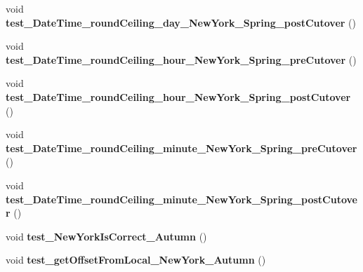 \begin{DoxyCompactItemize}
\item 
\hypertarget{classorg_1_1joda_1_1time_1_1_test_date_time_zone_cutover_a96cc00d2dcfd3eb93d263fc3bb6e4cfe}{void {\bfseries test\-\_\-\-Date\-Time\-\_\-round\-Ceiling\-\_\-day\-\_\-\-New\-York\-\_\-\-Spring\-\_\-post\-Cutover} ()}\label{classorg_1_1joda_1_1time_1_1_test_date_time_zone_cutover_a96cc00d2dcfd3eb93d263fc3bb6e4cfe}

\item 
\hypertarget{classorg_1_1joda_1_1time_1_1_test_date_time_zone_cutover_a1a1c0bdd0bbf9d72fb134674c1a861fa}{void {\bfseries test\-\_\-\-Date\-Time\-\_\-round\-Ceiling\-\_\-hour\-\_\-\-New\-York\-\_\-\-Spring\-\_\-pre\-Cutover} ()}\label{classorg_1_1joda_1_1time_1_1_test_date_time_zone_cutover_a1a1c0bdd0bbf9d72fb134674c1a861fa}

\item 
\hypertarget{classorg_1_1joda_1_1time_1_1_test_date_time_zone_cutover_a5eb0680eca52a1c0c7a1270f9ea97be7}{void {\bfseries test\-\_\-\-Date\-Time\-\_\-round\-Ceiling\-\_\-hour\-\_\-\-New\-York\-\_\-\-Spring\-\_\-post\-Cutover} ()}\label{classorg_1_1joda_1_1time_1_1_test_date_time_zone_cutover_a5eb0680eca52a1c0c7a1270f9ea97be7}

\item 
\hypertarget{classorg_1_1joda_1_1time_1_1_test_date_time_zone_cutover_ab2ed4bb0e9db602059ded0efc803475a}{void {\bfseries test\-\_\-\-Date\-Time\-\_\-round\-Ceiling\-\_\-minute\-\_\-\-New\-York\-\_\-\-Spring\-\_\-pre\-Cutover} ()}\label{classorg_1_1joda_1_1time_1_1_test_date_time_zone_cutover_ab2ed4bb0e9db602059ded0efc803475a}

\item 
\hypertarget{classorg_1_1joda_1_1time_1_1_test_date_time_zone_cutover_a1481f47a3947bba4041f58b1e02d1d58}{void {\bfseries test\-\_\-\-Date\-Time\-\_\-round\-Ceiling\-\_\-minute\-\_\-\-New\-York\-\_\-\-Spring\-\_\-post\-Cutover} ()}\label{classorg_1_1joda_1_1time_1_1_test_date_time_zone_cutover_a1481f47a3947bba4041f58b1e02d1d58}

\item 
\hypertarget{classorg_1_1joda_1_1time_1_1_test_date_time_zone_cutover_a31b1b4c81d15296e0cb3b3a71125e441}{void {\bfseries test\-\_\-\-New\-York\-Is\-Correct\-\_\-\-Autumn} ()}\label{classorg_1_1joda_1_1time_1_1_test_date_time_zone_cutover_a31b1b4c81d15296e0cb3b3a71125e441}

\item 
\hypertarget{classorg_1_1joda_1_1time_1_1_test_date_time_zone_cutover_afb2f29798d04c361f488b9b62fecfdd3}{void {\bfseries test\-\_\-get\-Offset\-From\-Local\-\_\-\-New\-York\-\_\-\-Autumn} ()}\label{classorg_1_1joda_1_1time_1_1_test_date_time_zone_cutover_afb2f29798d04c361f488b9b62fecfdd3}


\end{DoxyCompactItemize}
